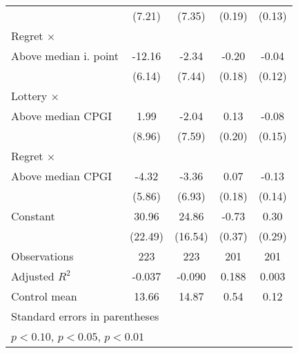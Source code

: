 \begin{table}[htbp]
\begin{tabular}{l*{4}{c}}
                &   (7.21)         &   (7.35)         &   (0.19)         &   (0.13)         \\
\addlinespace
Regret $\times$ \\ Above median i. point&   -12.16\sym{**} &    -2.34         &    -0.20         &    -0.04         \\
                &   (6.14)         &   (7.44)         &   (0.18)         &   (0.12)         \\
\addlinespace
Lottery $\times$ \\ Above median CPGI&     1.99         &    -2.04         &     0.13         &    -0.08         \\
                &   (8.96)         &   (7.59)         &   (0.20)         &   (0.15)         \\
\addlinespace
Regret $\times$ \\ Above median CPGI&    -4.32         &    -3.36         &     0.07         &    -0.13         \\
                &   (5.86)         &   (6.93)         &   (0.18)         &   (0.14)         \\
\addlinespace
Constant        &    30.96         &    24.86         &    -0.73\sym{*}  &     0.30         \\
                &  (22.49)         &  (16.54)         &   (0.37)         &   (0.29)         \\
\midrule
Observations    &      223         &      223         &      201         &      201         \\
Adjusted \(R^{2}\)&   -0.037         &   -0.090         &    0.188         &    0.003         \\
Control mean    &    13.66         &    14.87         &     0.54         &     0.12         \\
\bottomrule
\multicolumn{5}{l}{\footnotesize Standard errors in parentheses}\\
\multicolumn{5}{l}{\footnotesize \sym{*} \(p<0.10\), \sym{**} \(p<0.05\), \sym{***} \(p<0.01\)}\\
\end{tabular}
\end{table}


